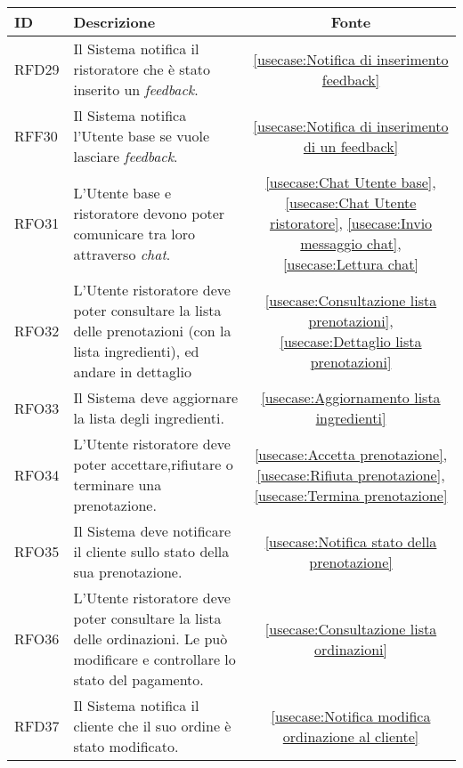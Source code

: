 \begin{table}[H]
	\renewcommand{\arraystretch}{1.5}
	\centering
	\begin{tabularx}{\textwidth}{l|X|c}
		\textbf{ID} & \textbf{Descrizione}                                                                                                      & \textbf{Fonte} \\
		\hline
		RFD29       & Il Sistema notifica il ristoratore che è stato inserito un \textit{feedback}.                                                   &  \autoref{usecase:Notifica di inserimento feedback}           \\
		\hline
		RFF30       & Il Sistema notifica l'Utente base se vuole lasciare \textit{feedback}.                      									 & \autoref{usecase:Notifica di inserimento di un feedback}            \\
		\hline
		RFO31       & L'Utente base e ristoratore devono poter comunicare tra loro attraverso \textit{chat}.                                		& \autoref{usecase:Chat Utente base}, \autoref{usecase:Chat Utente ristoratore}, \autoref{usecase:Invio messaggio chat}, \autoref{usecase:Lettura chat}               \\
		\hline
		RFO32       & L'Utente ristoratore deve poter consultare la lista delle prenotazioni (con la lista ingredienti), ed andare in dettaglio     &  \autoref{usecase:Consultazione lista prenotazioni}, \autoref{usecase:Dettaglio lista prenotazioni}           \\
		\hline
		RFO33       & Il Sistema deve aggiornare la lista degli ingredienti.        																& \autoref{usecase:Aggiornamento lista ingredienti}            \\
		\hline
		RFO34       & L'Utente ristoratore deve poter accettare,rifiutare o terminare una prenotazione. 											&  \autoref{usecase:Accetta prenotazione}, \autoref{usecase:Rifiuta prenotazione}, \autoref{usecase:Termina prenotazione}           \\
		\hline
		RFO35       & Il Sistema deve notificare il cliente sullo stato della sua prenotazione.						                                 & \autoref{usecase:Notifica stato della prenotazione}            \\
		\hline
		RFO36       & L'Utente ristoratore deve poter consultare la lista delle ordinazioni. Le può modificare e controllare lo stato del pagamento.   &  \autoref{usecase:Consultazione lista ordinazioni}           \\
		\hline
		RFD37       & Il Sistema notifica il cliente che il suo ordine è stato modificato.                   			 							&  \autoref{usecase:Notifica modifica ordinazione al cliente}           \\

\end{tabularx}
\end{table}

